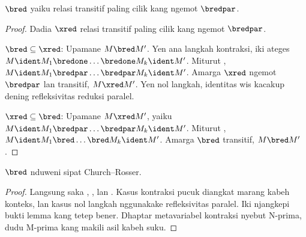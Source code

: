 \documentclass[../../../include/open-logic-section]{subfiles}
\begin{document}
\begin{lem}
  $\bred$ yaiku relasi
  transitif paling cilik
  kang ngemot $\bredpar$.
\end{lem}

\begin{proof}
  Dadia $\xred$ relasi
  transitif paling cilik
  kang ngemot $\bredpar$.

  $\bred \subseteq \xred$:
  Upamane $M \bred M'$.
  Yen ana langkah kontraksi,
  iki ateges $M \ident M_1
  \bredone \dots \bredone
  M_k \ident M'$.
  Miturut ,
  $M \ident M_1 \bredpar
  \dots \bredpar M_k
  \ident M'$.
  Amarga $\xred$ ngemot
  $\bredpar$ lan transitif,
  $M \xred M'$.
  Yen nol langkah, identitas
  wis kacakup dening
  refleksivitas reduksi paralel.

  $\xred \subseteq \bred$:
  Upamane $M \xred M'$,
  yaiku $M \ident M_1
  \bredpar \dots
  \bredpar M_k \ident M'$.
  Miturut ,
  $M \ident M_1 \bred
  \dots \bred M_k \ident M'$.
  Amarga $\bred$ transitif,
  $M \bred M'$.
\end{proof}

\begin{thm}
  $\bred$ nduweni
  sipat Church--Rosser.
\end{thm}

\begin{proof}
  Langsung saka
  ,
  ,
  lan .
  Kasus kontraksi pucuk diangkat marang kabeh konteks, lan kasus nol langkah nggunakake refleksivitas paralel. Iki njangkepi bukti lemma kang tetep bener. Dhaptar metavariabel kontraksi nyebut N-prima, dudu M-prima kang makili asil kabeh suku.
\end{proof}
\end{document}
